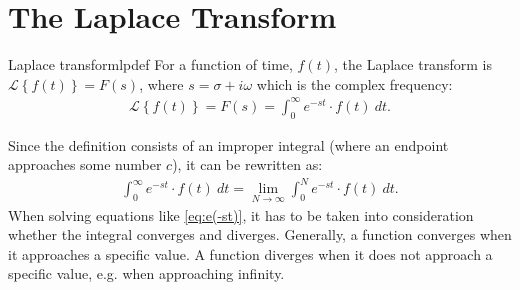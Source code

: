 \section{The Laplace Transform}
\begin{definition}{Laplace transform}{lpdef}
For a function of time, $f(t)$, the Laplace transform is $\mathcal{L}\left\{ f(t)\right\} = F(s)$, where $s = \sigma + i\omega$ which is the complex frequency:
\begin{align}
\mathcal{L} \left\{f(t) \right\}=F(s)=\int_{0}^{\infty} e^{-st}\cdot f(t)\ dt.
\end{align}
\end{definition}
\noindent Since the definition consists of an improper integral (where an endpoint approaches some number $c$), it can be rewritten as:
\begin{align}
\int_{0}^{\infty} e^{-st}\cdot f(t)\ dt = \lim_{N \to \infty} \int_{0}^{N} e^{-st}\cdot f(t)\ dt. \label{eq:e(-st)}
\end{align}
When solving equations like \eqref{eq:e(-st)}, it has to be taken into consideration whether the integral converges and diverges. Generally, a function converges when it approaches a specific value. A function diverges when it does not approach a specific value, e.g. when approaching infinity.

